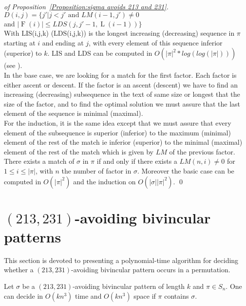 \documentclass[a4paper]{llncs}
\newcommand{\ptext}{\pi}
\newcommand{\pmotif}{\sigma}
\newcounter{num}
\DeclareMathOperator{\firsta}{L}
\newcommand{\first}[1]{\firsta({#1})}
\DeclareMathOperator{\factora}{F}
\newcommand{\factor}[1]{\factora({#1})}
\begin{document}
\begin{proof}[of Proposition~\ref{Proposition:sigma avoids 213 and 231}]
$D(i,j)=\{j'|\text{$j<j'$ and $LM(i-1,j')\neq 0$}$ \\
\indent \indent \indent and  $|\factor{i}| \leq LDS(j,j'-1,\first{i-1}) \}$ \\
					                       
With LIS(i,j,k) (LDS(i,j,k)) is the longest increasing (decreasing) sequence in $\ptext$ starting at $i$ and ending at $j$,
with every element of this sequence
inferior (superior) to $k$. 
LIS and LDS can be computed in $O(|\ptext|^2*log(log(|\ptext|)))$ (see \cite{Bespamyatnikh00enumeratinglongest}).\\
			
In the base case, 
we are looking for a match for the first factor.
Each factor is either ascent or descent.
If the factor is an ascent (descent)
we have to find an increasing (decreasing) subsequence
in the text of same size or longest that 
the size of the factor,
and to find the optimal solution 
we must assure that the last element
of the sequence is minimal (maximal).\\
For the induction, it is the same idea
except that we must assure that 
every element of the subsequence is superior (inferior)
to the maximum (minimal) element of the rest of the match
ie inferior (superior) to the minimal (maximal) element of the rest of the match
which is given by $LM$ of
the previous factor.\\

There exists a match of $\pmotif$ in $\ptext$ if and only if
there exists a $LM(n,i)\neq 0$ for $1 \leq i \leq |\ptext|$,
with $n$ the number of factor in $\pmotif$.
Moreover the basic case can be computed in $O(|\ptext|^2)$
and the induction on $O(|\pmotif||\ptext|^2)$.
\qed
\end{proof}
					

\section{$(213,231)$-avoiding bivincular patterns}	
	\label{section:bivincular}

	This section is devoted to presenting a polynomial-time algorithm for deciding whether
	a $(213,231)$-avoiding bivincular pattern occurs in a permutation.

	\begin{proposition}
		\label{Proposition:bivincular pattern}
			Let $\sigma$ be a $(213,231)$-avoiding bivincular pattern of length $k$
			and $\pi \in S_n$.
			One can decide in $O(kn^3)$ time
			and $O(kn^3)$ space if $\pi$ contains $\sigma$.
	\end{proposition}
					
\end{document}
